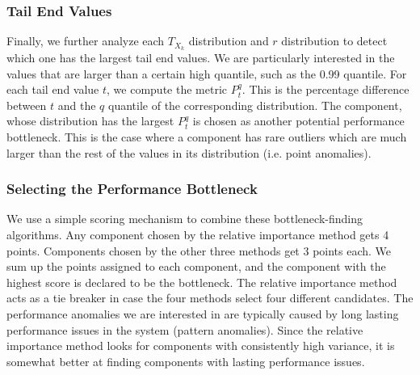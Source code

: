 \subsubsection{Tail End Values}

\label{sec:tailend}
Finally, we further analyze each $T_{X_k}$ distribution and $r$ distribution to detect which one has the largest tail end values.
We are particularly interested in the values that are larger than a certain high quantile, such as the 0.99 quantile.
For each tail end value $t$, we compute the metric $P^q_t$. This is the percentage difference between $t$ and the
$q$ quantile of the corresponding distribution. The component, whose distribution has
the largest $P^q_t$ is chosen as another potential performance bottleneck.
This is the case where a component has rare outliers which are much larger than the rest of 
the values in its distribution (i.e. point anomalies).

\subsubsection{Selecting the Performance Bottleneck}


We use a simple scoring mechanism to combine these bottleneck-finding algorithms.
Any component chosen by the relative importance
method gets 4 points. Components chosen by the other three methods get 3 points each. 
We sum up the points assigned to each component, and the component with the highest
score is declared to be the bottleneck. The relative importance method acts as a tie breaker
in case the four methods select four different candidates. The performance anomalies we
are interested in are typically caused by long lasting performance issues in the system 
(pattern anomalies). Since the relative importance method looks for components with
consistently high variance, it is somewhat better at finding components
with lasting performance issues.
